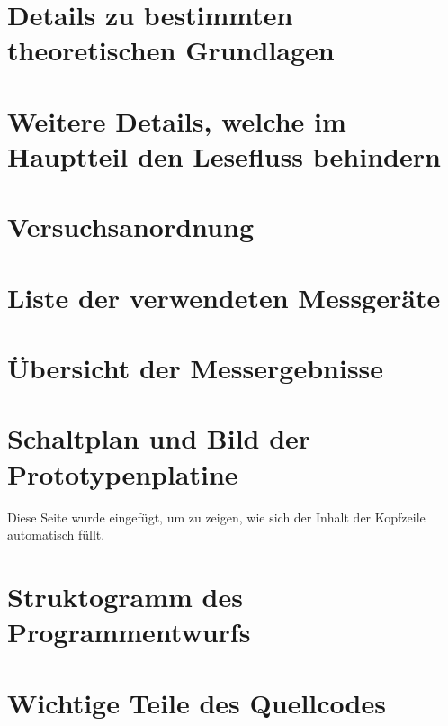 \setcounter{chapter}{1}

\section{Details zu bestimmten theoretischen Grundlagen}

\section{Weitere Details, welche im Hauptteil den Lesefluss behindern}

\setcounter{chapter}{2}
\setcounter{section}{0}
\setcounter{table}{0}
\setcounter{figure}{0}

\section{Versuchsanordnung}

\section{Liste der verwendeten Messgeräte}

\section{Übersicht der Messergebnisse}

\section{Schaltplan und Bild der Prototypenplatine}

\clearpage

Diese Seite wurde eingefügt, um zu zeigen, wie sich der Inhalt der Kopfzeile automatisch füllt.

\setcounter{chapter}{3}
\setcounter{section}{0}
\setcounter{table}{0}
\setcounter{figure}{0}

\section{Struktogramm des Programmentwurfs}

\section{Wichtige Teile des Quellcodes}

\setcounter{chapter}{4}
\setcounter{section}{0}
\setcounter{table}{0}
\setcounter{figure}{0}


